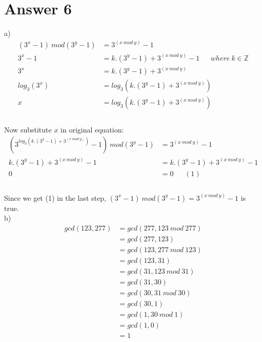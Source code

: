 \documentclass[12pt]{article}
\begin{document}
\section*{Answer 6}
\hspace{6mm}a)
\begin{equation*}
\begin{split}
(3^x -1 )\ mod(3^y -1) &= 3^{(x \ mod \ y)} -1 \\
3^x -1		 &= k.(3^y -1) + 3^{(x \ mod \ y)}-1 \ \ \ \ \ \ \ where \  k \in \mathbb{Z} \\
3^x 			 &= k.(3^y -1) + 3^{(x \ mod \ y)} \\
log_3(3^x)		 &= log_3(k.(3^y -1) + 3^{(x \ mod \ y)}) \\
x			 &= log_3(k.(3^y -1) + 3^{(x \ mod \ y)})  \\
\end{split}	 
\end{equation*} \\ 
\quad Now substitute $x$ in original equation:\\
\begin{equation*}
\begin{split}
(3^{log_3(k.(3^y -1) + 3^{(x \ mod \ y)})}-1)\ mod(3^y -1) &= 3^{(x \ mod \ y)} -1 \\
k.(3^y -1) + 3^{(x \ mod \ y)}-1		 				&= k.(3^y -1) + 3^{(x \ mod \ y)}-1  \\
0											&= 0 \ \ \ \ \ \ \ (1) \\
\end{split}	 
\end{equation*} \\ 
\quad Since we get (1) in the last step, $(3^x -1 )\ mod(3^y -1) = 3^{(x \ mod \ y)} -1$ is true.\\


b) 
\begin{equation*}
\begin{split}
gcd(123,277) &= gcd(277,123 \ mod\ 277) \\
			 &= gcd(277,123) \\
			 &= gcd(123,277 \ mod\ 123) \\
			 &= gcd(123,31) \\
			 &= gcd(31,123 \ mod\ 31)  \\
			 &= gcd(31,30)  \\
			 &= gcd(30,31 \ mod\ 30)   \\
		 	 &= gcd(30,1)   \\
		 	 &= gcd(1,30 \ mod\ 1)    \\
			 &= gcd(1,0)    \\
			 &= 1           \\	
\end{split}	 
\end{equation*} \\ \\
\end{document}
